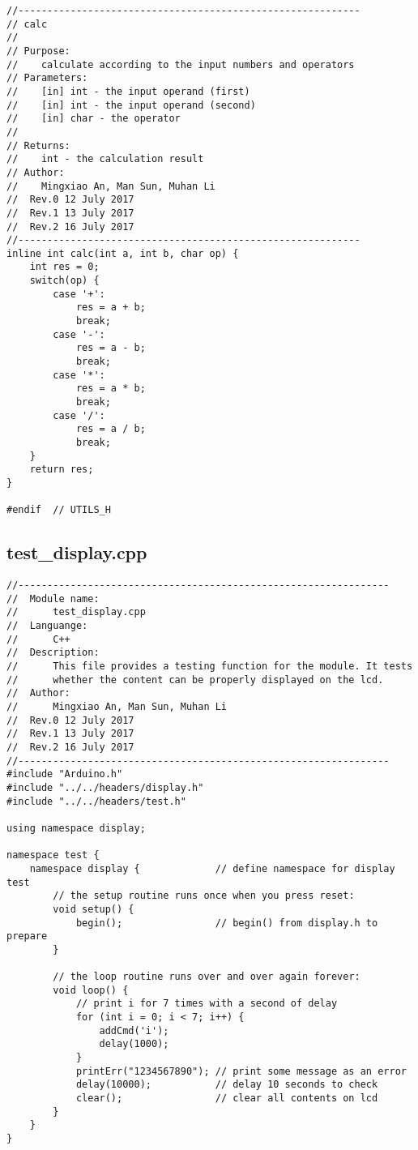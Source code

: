 \begin{verbatim}
//-----------------------------------------------------------  
// calc
//  
// Purpose:  
//    calculate according to the input numbers and operators
// Parameters:  
//    [in] int - the input operand (first)
//    [in] int - the input operand (second)
//    [in] char - the operator
//      
// Returns:  
//    int - the calculation result
// Author:  
//    Mingxiao An, Man Sun, Muhan Li
//  Rev.0 12 July 2017
//  Rev.1 13 July 2017
//  Rev.2 16 July 2017
//-----------------------------------------------------------
inline int calc(int a, int b, char op) {
    int res = 0;
    switch(op) {
        case '+':
            res = a + b;
            break;
        case '-':
            res = a - b;
            break;
        case '*':
            res = a * b;
            break;
        case '/':
            res = a / b;
            break;
    }
    return res;
}

#endif  // UTILS_H

\end{verbatim}

\subsection{test\_display.cpp}
\begin{verbatim}
//----------------------------------------------------------------
//  Module name:
//      test_display.cpp
//  Languange:
//      C++
//  Description:
//      This file provides a testing function for the module. It tests
//      whether the content can be properly displayed on the lcd.
//  Author:
//      Mingxiao An, Man Sun, Muhan Li
//  Rev.0 12 July 2017
//  Rev.1 13 July 2017
//  Rev.2 16 July 2017
//----------------------------------------------------------------
#include "Arduino.h"
#include "../../headers/display.h"
#include "../../headers/test.h"

using namespace display;

namespace test { 
    namespace display {             // define namespace for display test
        // the setup routine runs once when you press reset:
        void setup() {
            begin();                // begin() from display.h to prepare
        }

        // the loop routine runs over and over again forever:
        void loop() {
            // print i for 7 times with a second of delay
            for (int i = 0; i < 7; i++) {
                addCmd('i');
                delay(1000);
            }
            printErr("1234567890"); // print some message as an error
            delay(10000);           // delay 10 seconds to check
            clear();                // clear all contents on lcd
        }
    }
}

\end{verbatim}

